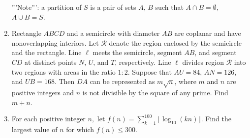 \documentclass{article}
\begin{document}
\begin{enumerate}[label=\arabic*., itemsep=0.5em]
'''Note''': a partition of $S$ is a pair of sets $A$, $B$ such that $A \cap B = \emptyset$, $A \cup B = S$.\par \vspace{0.5em}\item Rectangle $ABCD$ and a semicircle with diameter $AB$ are coplanar and have nonoverlapping interiors. Let $\mathcal{R}$ denote the region enclosed by the semicircle and the rectangle. Line $\ell$ meets the semicircle, segment $AB$, and segment $CD$ at distinct points $N$, $U$, and $T$, respectively. Line $\ell$ divides region $\mathcal{R}$ into two regions with areas in the ratio $1: 2$. Suppose that $AU = 84$, $AN = 126$, and $UB = 168$. Then $DA$ can be represented as $m\sqrt {n}$, where $m$ and $n$ are positive integers and $n$ is not divisible by the square of any prime. Find $m + n$.\par \vspace{0.5em}\item For each positive integer $n,$ let $f(n) = \sum_{k = 1}^{100} \lfloor \log_{10} (kn) \rfloor$. Find the largest value of $n$ for which $f(n) \le 300$.


\end{enumerate}
\end{document}
